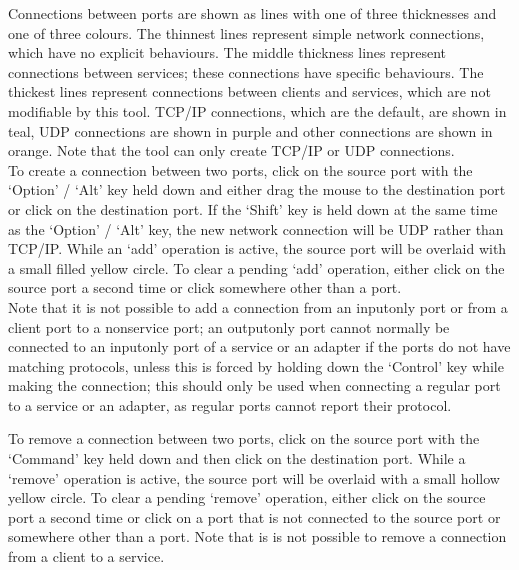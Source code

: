 Connections between ports are shown as lines with one of three thicknesses and one of
three colours.
The thinnest lines represent simple \yarp{} network connections, which have no explicit
behaviours.
The middle thickness lines represent connections between  services; these
connections have specific behaviours.
The thickest lines represent connections between clients and services, which are not
modifiable by this tool.
TCP/IP connections, which are the default, are shown in teal, UDP connections are shown in
purple and other connections are shown in orange.
Note that the tool can only create TCP/IP or UDP connections.\\

To create a connection between two ports, click on the source port with the `Option' /
`Alt' key held down and either drag the mouse to the destination port or click on the
destination port.
If the `Shift' key is held down at the same time as the `Option' / `Alt' key, the new
network connection will be UDP rather than TCP/IP.
While an `add' operation is active, the source port will be overlaid with a small filled
yellow circle.
To clear a pending `add' operation, either click on the source port a second time or click
somewhere other than a port.\\

Note that it is not possible to add a connection from an input\longDash{}only port or from
a client port to a non\longDash{}service port; an output\longDash{}only port cannot
normally be connected to an input\longDash{}only port of a service or an adapter if the
ports do not have matching protocols, unless this is forced by holding down the `Control'
key while making the connection; this should only be used when connecting a regular
\yarp{} port to a service or an adapter, as regular \yarp{} ports cannot report their
protocol.


\condPage
{}

To remove a connection between two ports, click on the source port with the `Command' key
held down and then click on the destination port.
While a `remove' operation is active, the source port will be overlaid with a small
hollow yellow circle.
To clear a pending `remove' operation, either click on the source port a second time or
click on a port that is not connected to the source port or somewhere other than a port.
Note that is is not possible to remove a connection from a client to a service.
\\

